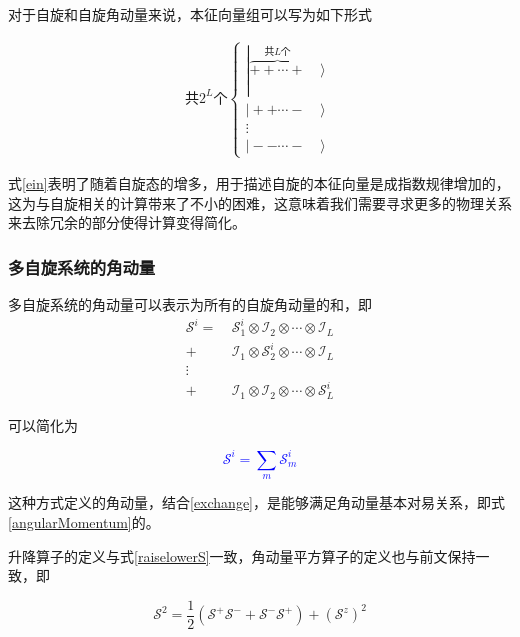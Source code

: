 \documentclass[UTF8,12pt]{article}
\providecommand\Ket[1]{\left|\right. #1 \left.\right\rangle}
\numberwithin{equation}{subsection}
\providecommand{\empB}[1]{\textcolor{blue}{#1}}
\providecommand{\sumL}{\sum\limits}
\begin{document}
	对于自旋和自旋角动量来说，本征向量组可以写为如下形式\begin{snugshade}
		\begin{equation}
			\begin{aligned}
				\text{共}2^L\text{个}\left\lbrace
				\begin{array}{ll}
					\Ket{\overbrace{++\cdots+}^{\text{共}L\text{个}}&}\\
					\Ket{++\cdots-&}\\
					\vdots&\\
					\Ket{--\cdots-&}
				\end{array}
				\right.
			\end{aligned}
			\label{ein}
		\end{equation}
	\end{snugshade}

	式\ref{ein}表明了随着自旋态的增多，用于描述自旋的本征向量是成指数规律增加的，这为与自旋相关的计算带来了不小的困难，这意味着我们需要寻求更多的物理关系来去除冗余的部分使得计算变得简化。
	\subsubsection{多自旋系统的角动量}
	多自旋系统的角动量可以表示为所有的自旋角动量的和，即
	\begin{equation}
			\nonumber
			\begin{aligned}
				\mathcal S^i =~ &\mathcal S^i_1\otimes \mathcal I_2\otimes\cdots\otimes \mathcal I_L\\
				+ &\mathcal I_1\otimes \mathcal S^i_2\otimes\cdots\otimes \mathcal I_L\\
				\vdots\\
				+ &\mathcal I_1\otimes \mathcal I_2\otimes\cdots\otimes \mathcal S^i_L
			\end{aligned}
	\end{equation}
	
	可以简化为
	\begin{snugshade}
		\empB{\begin{equation}
			\mathcal S^i = \sumL_m\mathcal S^i_m
			\label{multispin}
		\end{equation}}
	\end{snugshade}
	
	这种方式定义的角动量，结合\ref{exchange}，是能够满足角动量基本对易关系，即式\ref{angularMomentum}的。
	
	升降算子的定义与式\ref{raiselowerS}一致，角动量平方算子的定义也与前文保持一致，即
	\begin{snugshade}
		\begin{equation}
			\mathcal S^2 = \frac{1}{2}(\mathcal S^+\mathcal S^-+\mathcal S^-\mathcal S^+)+(\mathcal S^z)^2
			\label{multisquare}
		\end{equation}
	\end{snugshade}
\end{document}
